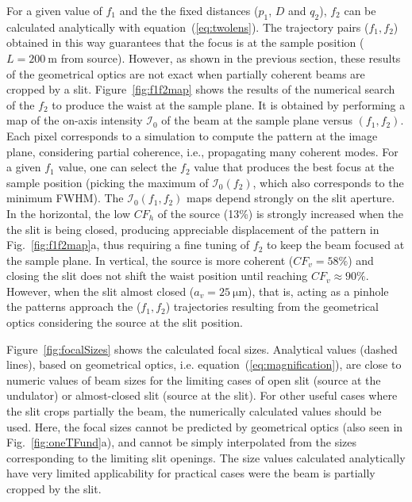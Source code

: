 \documentclass[9pt,twocolumn,twoside]{osajnl}
\begin{document}
For a given value of $f_1$ and the the fixed distances ($p_1$, $D$ and $q_2$), $f_2$ can be calculated analytically with equation~(\ref{eq:twolens}). The trajectory pairs ($f_1,f_2$) obtained in this way guarantees that the focus is at the sample position ($L=\SI{200}{\meter}$ from source). However, as shown in the previous section, these results of the geometrical optics are not exact when partially coherent beams are cropped by a slit. 
Figure~\ref{fig:f1f2map} shows the results of the numerical search of the $f_2$ to produce the waist at the sample plane. It is obtained by performing a map of the on-axis intensity $\mathcal{I}_0$ of the beam at the sample plane versus $(f_1,f_2)$. Each pixel corresponds to a simulation to compute the pattern at the image plane, considering partial coherence, i.e., propagating many coherent modes. For a given $f_1$ value, one can select the $f_2$ value that produces the best focus at the sample position (picking the maximum of $\mathcal{I}_0(f_2)$, which also corresponds to the minimum FWHM). 
The $\mathcal{I}_0(f_1,f_2)$ maps depend strongly on the slit aperture. In the horizontal, the low $CF_h$ of the source (13\%) is strongly increased when the the slit is being closed, producing appreciable displacement of the pattern in Fig.~\ref{fig:f1f2map}a, thus requiring a fine tuning of $f_2$ to keep the beam focused at the sample plane. In vertical, the source is more coherent ($CF_v=58\%$) and closing the slit does not 
shift the waist position until reaching $CF_v\approx90\%$. However, when the slit almost closed ($a_v=\SI{25}{\micro\meter}$), that is, acting as a pinhole the patterns approach the ($f_1,f_2$) trajectories resulting from the geometrical optics considering the source at the slit position.

Figure~\ref{fig:focalSizes} shows the calculated focal sizes. Analytical values (dashed lines), based on geometrical optics, i.e. equation~(\ref{eq:magnification}), are close to numeric values of beam sizes for the limiting cases of open slit (source at the undulator) or almost-closed slit (source at the slit). For other useful cases where the slit crops partially the beam, the numerically calculated values should be used. Here, the focal sizes cannot be predicted by geometrical optics (also seen in Fig.~\ref{fig:oneTFund}a), and cannot be simply interpolated from the sizes corresponding to the limiting slit openings. The size values calculated analytically have very limited applicability for practical cases were the beam is partially cropped by the slit. 
\end{document}
